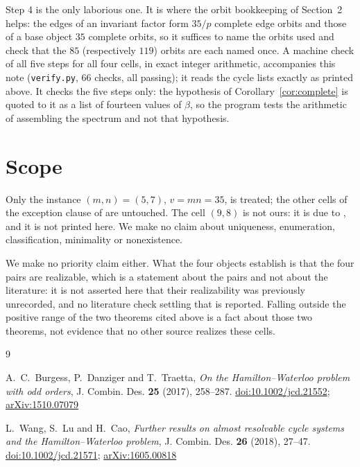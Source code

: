 \documentclass[11pt]{amsart}
\begin{document}
Step 4 is the only laborious one. It is where the orbit bookkeeping of
Section~2 helps: the edges of an invariant factor form $35/p$ complete
edge orbits and those of a base object $35$ complete orbits, so it
suffices to name the orbits used and check that the $85$ (respectively
$119$) orbits are each named once. A machine check of all five steps for
all four cells, in exact integer arithmetic, accompanies this note
(\texttt{verify.py}, $66$ checks, all passing); it reads the cycle lists
exactly as printed above. It checks the five steps only: the hypothesis
of Corollary~\ref{cor:complete} is quoted to it as a list of fourteen
values of $\beta$, so the program tests the arithmetic of assembling the
spectrum and not that hypothesis.

\section{Scope}

Only the instance $(m,n)=(5,7)$, $v=mn=35$, is treated; the other cells
of the exception clause of \cite{BDT17} are untouched. The cell $(9,8)$
is not ours: it is due to \cite{WLC}, and it is not printed here. We
make no claim about uniqueness, enumeration, classification, minimality
or nonexistence.

We make no priority claim either. What the four objects establish is
that the four pairs are realizable, which is a statement about the
pairs and not about the literature: it is not asserted here that their
realizability was previously unrecorded, and no literature check
settling that is reported. Falling outside the positive range of the two
theorems cited above is a fact about those two theorems, not evidence
that no other source realizes these cells.

\begin{thebibliography}{9}

A.~C.~Burgess, P.~Danziger and T.~Traetta,
\emph{On the Hamilton--Waterloo problem with odd orders},
J. Combin. Des. \textbf{25} (2017), 258--287.
\href{https://doi.org/10.1002/jcd.21552}{doi:10.1002/jcd.21552};
\href{https://arxiv.org/abs/1510.07079}{arXiv:1510.07079}

L.~Wang, S.~Lu and H.~Cao,
\emph{Further results on almost resolvable cycle systems and the
Hamilton--Waterloo problem},
J. Combin. Des. \textbf{26} (2018), 27--47.
\href{https://doi.org/10.1002/jcd.21571}{doi:10.1002/jcd.21571};
\href{https://arxiv.org/abs/1605.00818}{arXiv:1605.00818}

\end{thebibliography}
\end{document}
